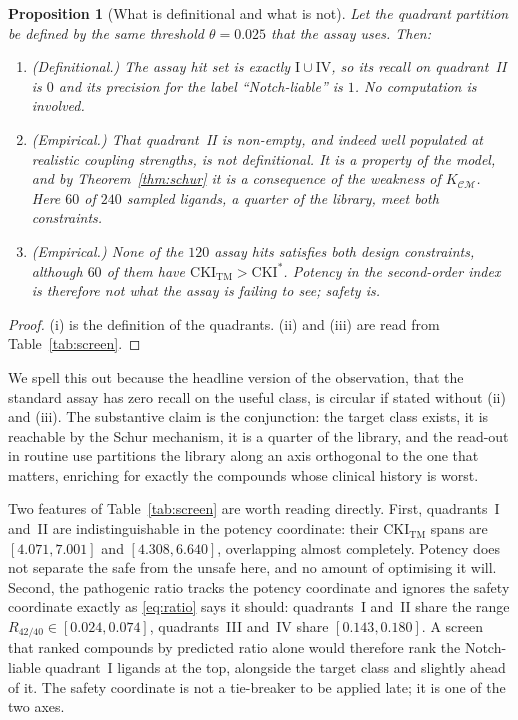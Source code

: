 \documentclass[11pt,reqno]{amsart}
\theoremstyle{plain}
\newtheorem{proposition}[theorem]{Proposition}
\theoremstyle{definition}
\theoremstyle{remark}
\numberwithin{equation}{section}
\newcommand{\CKI}{\mathrm{CKI}}
\newcommand{\CKItm}{\CKI_{\mathrm{TM}}}
\newcommand{\CC}{\mathcal{C}}
\newcommand{\MM}{\mathcal{M}}
\begin{document}
\begin{proposition}[What is definitional and what is not]
\label{prop:anti}
Let the quadrant partition be defined by the same threshold $\theta=0.025$ that the assay uses. Then:
\begin{enumerate}[label=\textup{(\roman*)},leftmargin=2.2em,itemsep=3pt]
\item \textup{(Definitional.)} The assay hit set is exactly $\mathrm{I}\cup\mathrm{IV}$, so its recall on quadrant~II is $0$ and its precision for the label ``Notch-liable'' is $1$. No computation is involved.
\item \textup{(Empirical.)} That quadrant~II is non-empty, and indeed well populated at realistic coupling strengths, is not definitional. It is a property of the model, and by Theorem~\ref{thm:schur} it is a consequence of the weakness of $K_{\CC\MM}$. Here $60$ of $240$ sampled ligands, a quarter of the library, meet both constraints.
\item \textup{(Empirical.)} None of the $120$ assay hits satisfies both design constraints, although $60$ of them have $\CKItm>\CKI^\ast$. Potency in the second-order index is therefore not what the assay is failing to see; safety is.
\end{enumerate}
\end{proposition}

\begin{proof}
(i) is the definition of the quadrants. (ii) and (iii) are read from Table~\ref{tab:screen}.
\end{proof}

We spell this out because the headline version of the observation, that the standard assay has zero recall on the useful class, is circular if stated without (ii) and (iii). The substantive claim is the conjunction: the target class exists, it is reachable by the Schur mechanism, it is a quarter of the library, and the read-out in routine use partitions the library along an axis orthogonal to the one that matters, enriching for exactly the compounds whose clinical history is worst.

Two features of Table~\ref{tab:screen} are worth reading directly. First, quadrants~I and~II are indistinguishable in the potency coordinate: their $\CKItm$ spans are $[4.071,7.001]$ and $[4.308,6.640]$, overlapping almost completely. Potency does not separate the safe from the unsafe here, and no amount of optimising it will. Second, the pathogenic ratio tracks the potency coordinate and ignores the safety coordinate exactly as \eqref{eq:ratio} says it should: quadrants~I and~II share the range $R_{42/40}\in[0.024,0.074]$, quadrants~III and~IV share $[0.143,0.180]$. A screen that ranked compounds by predicted ratio alone would therefore rank the Notch-liable quadrant~I ligands at the top, alongside the target class and slightly ahead of it. The safety coordinate is not a tie-breaker to be applied late; it is one of the two axes.
\end{document}
